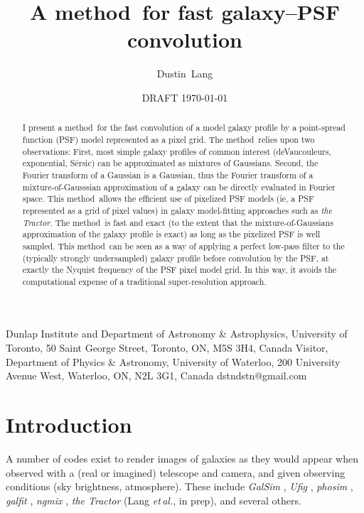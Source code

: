 \documentclass[11pt,preprint]{aastex}
\newcommand{\foreign}[1]{\emph{#1}}
\newcommand{\etal}{\foreign{et\,al.}}
\newcommand{\project}[1]{\textsl{#1}}
\newcommand{\trick}{method}
\begin{document}
\title{A \trick\ for fast galaxy--PSF convolution}
\author{Dustin~Lang}
%
{Dunlap Institute and Department of Astronomy \& Astrophysics,
  University of Toronto,
  50 Saint George Street, Toronto, ON, M5S 3H4, Canada}
%
{Visitor, Department of Physics \& Astronomy,
  University of Waterloo,
  200 University Avenue West,
  Waterloo, ON, N2L 3G1, Canada}
%
{dstndstn@gmail.com}
\date{DRAFT \today}

\begin{abstract}
  I present a \trick\ for the fast convolution of a model galaxy
  profile by a point-spread function (PSF) model 
  represented as a pixel grid.
  The \trick\ relies upon two
  observations: First, most simple galaxy profiles of common interest
  (deVaucouleurs, exponential, S\'ersic) can be approximated as
  mixtures of Gaussians.  Second, the Fourier transform of a Gaussian
  is a Gaussian, thus the Fourier transform of a mixture-of-Gausssian
  approximation of a galaxy can be directly evaluated in Fourier
  space.
  This \trick\ allows
  the efficient use of pixelized PSF models (ie, a PSF represented as
  a grid of pixel values) in galaxy model-fitting approaches such as
  \project{the Tractor}.
  The \trick\ is fast and exact (to the extent that the mixture-of-Gaussians
  approximation of the galaxy profile is exact) as long as the pixelized PSF
  is well sampled.
  This \trick\ can be seen as a way of applying a perfect low-pass filter to
  the (typically strongly undersampled) galaxy profile before convolution by
  the PSF, at exactly the Nyquist frequency of the PSF pixel model grid.  In
  this way, it avoids the computational expense of a traditional super-resolution
  approach.
\end{abstract}

\section{Introduction}

A number of codes exist to render images of galaxies as they would
appear when observed with a (real or imagined) telescope and camera,
and given observing conditions (sky brightness, atmosphere).  These
include \project{GalSim} \citep{galsim}, \project{Ufig} \citep{ufig},
\project{phosim} \citep{phosim}, \project{galfit} \citep{galfit}, 
\project{ngmix} \citep{ngmix},
\project{the Tractor} (Lang \etal, in prep), and several others.
\end{document}
